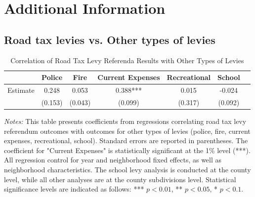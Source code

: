 \clearpage


\section{Additional Information} \label{sec:appxc}



\subsection{Road tax levies vs. Other types of levies}

\begin{table}[ht!]
    \centering
    \caption{Correlation of Road Tax Levy Referenda Results with Other Types of Levies}
    \begin{tabular}{lcccccc}
    \toprule
    & Police & Fire & Current Expenses & Recreational & School \\
    \midrule
    Estimate & 0.248 & 0.053 & 0.388*** & 0.015 & -0.024 \\
    & (0.153) & (0.043) & (0.099) & (0.317) & (0.092) \\
    \bottomrule
    \end{tabular}
    \begin{minipage}{\textwidth}
    \footnotesize
    \textit{Notes:} This table presents coefficients from regressions correlating road tax levy referendum outcomes with outcomes for other types of levies (police, fire, current expenses, recreational, school). Standard errors are reported in parentheses. The coefficient for "Current Expenses" is statistically significant at the 1\% level (***). All regression control for year and neighborhood fixed effects, as well as neighborhood characteristics. The school levy analysis is conducted at the county level, while all other analyses are at the county subdivisions level. Statistical significance levels are indicated as follows: *** $p<0.01$, ** $p<0.05$, * $p<0.1$.
    \end{minipage}
\end{table}

